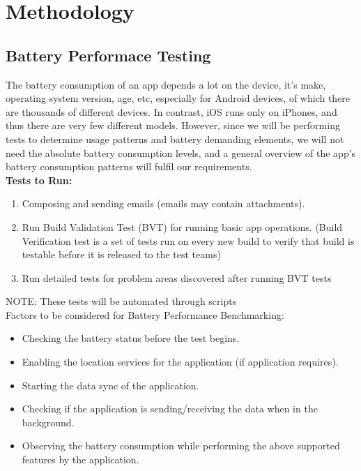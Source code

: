 \setlength\parindent{0pt}

\chapter{Methodology}

\section{Battery Performace Testing}
The battery consumption of an app depends a lot on the device, it’s make, operating system version, age, etc, especially for Android devices, of which there are thousands of different devices. In contrast, iOS runs only on iPhones, and thus there are very few different models. However, since we will be performing tests to determine usage patterns and battery demanding elements, we will not need the absolute battery consumption levels, and a general overview of the app’s battery consumption patterns will fulfil our requirements.\\

\textbf {Tests to Run:}
\begin{enumerate}
	\item Composing and sending emails (emails may contain attachments).
	\item Run Build Validation Test (BVT) for running basic app operations. (Build Verification test is a set of tests run on every new build to verify that build is testable before it is released to the test teams)
	\item Run detailed tests for problem areas discovered after running BVT tests 
\end{enumerate}
NOTE: These tests will be automated through scripts \\

Factors to be considered for Battery Performance Benchmarking:
\begin{itemize}
	\item Checking the battery status before the test begins.
	\item Enabling the location services for the application (if application requires).
	\item Starting the data sync of the application.
	\item Checking if the application is sending/receiving the data when in the background.
	\item Observing the battery consumption while performing the above supported features by the application.
\end{itemize}

